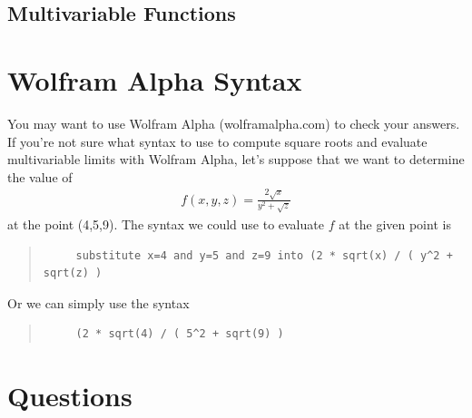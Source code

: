 %
%
%
\subsection{Multivariable Functions}
\section*{Wolfram Alpha Syntax}
You may want to use Wolfram Alpha (wolframalpha.com) to check your answers. If you're not sure what syntax to use to compute square roots and evaluate multivariable limits with Wolfram Alpha, let's suppose that we want to determine the value of
\begin{align*} 
  f(x,y,z) = \frac{2 \sqrt{x}}{y^2 + \sqrt{z}}
\end{align*}
at the point (4,5,9). The syntax we could use to evaluate $f$ at the given point is
\begin{quote}
  \begin{verbatim}
     substitute x=4 and y=5 and z=9 into (2 * sqrt(x) / ( y^2 + sqrt(z) )
  \end{verbatim}
\end{quote}
Or we can simply use the syntax
\begin{quote}
  \begin{verbatim}
     (2 * sqrt(4) / ( 5^2 + sqrt(9) )
  \end{verbatim}
\end{quote}
\section*{Questions}

